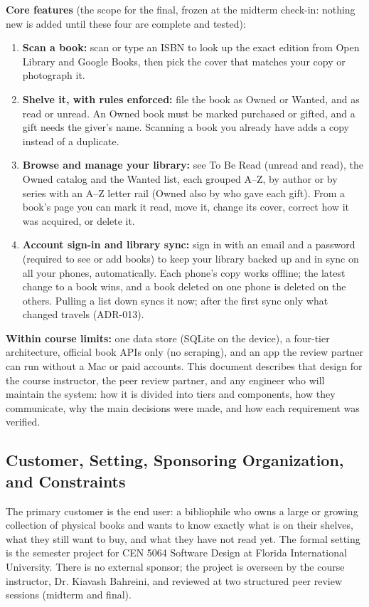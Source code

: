 \documentclass[12pt]{article}
\begin{document}
\textbf{Core features} (the scope for the final, frozen at the midterm check-in: nothing new is added until these four are complete and tested):
\begin{enumerate}[label=\textbf{UC\arabic*}, leftmargin=3.2em]
    \item \textbf{Scan a book:} scan or type an ISBN to look up the exact edition from Open Library and Google Books, then pick the cover that matches your copy or photograph it.
    \item \textbf{Shelve it, with rules enforced:} file the book as Owned or Wanted, and as read or unread. An Owned book must be marked purchased or gifted, and a gift needs the giver's name. Scanning a book you already have adds a copy instead of a duplicate.
    \item \textbf{Browse and manage your library:} see To Be Read (unread and read), the Owned catalog and the Wanted list, each grouped A--Z, by author or by series with an A--Z letter rail (Owned also by who gave each gift). From a book's page you can mark it read, move it, change its cover, correct how it was acquired, or delete it.
    \item \textbf{Account sign-in and library sync:} sign in with an email and a password (required to see or add books) to keep your library backed up and in sync on all your phones, automatically. Each phone's copy works offline; the latest change to a book wins, and a book deleted on one phone is deleted on the others. Pulling a list down syncs it now; after the first sync only what changed travels (ADR-013).
\end{enumerate}

\textbf{Within course limits:} one data store (SQLite on the device), a four-tier architecture, official book APIs only (no scraping), and an app the review partner can run without a Mac or paid accounts. This document describes that design for the course instructor, the peer review partner, and any engineer who will maintain the system: how it is divided into tiers and components, how they communicate, why the main decisions were made, and how each requirement was verified.

\subsection{Customer, Setting, Sponsoring Organization, and Constraints}

The primary customer is the end user: a bibliophile who owns a large or growing collection of physical books and wants to know exactly what is on their shelves, what they still want to buy, and what they have not read yet. The formal setting is the semester project for CEN 5064 Software Design at Florida International University. There is no external sponsor; the project is overseen by the course instructor, Dr. Kiavash Bahreini, and reviewed at two structured peer review sessions (midterm and final).
\end{document}
